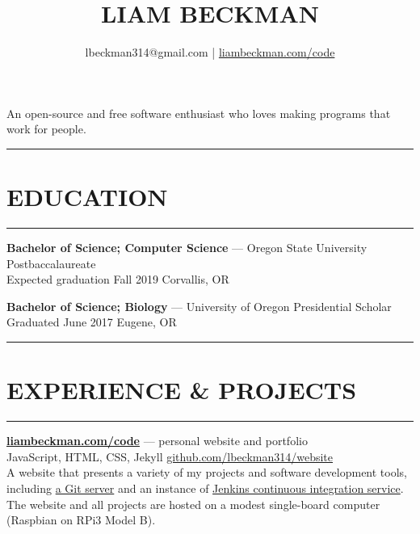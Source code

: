 \documentclass[a4paper]{article}
\title{\textcolor{my-red}{LIAM BECKMAN}}
\author{lbeckman314@gmail.com | \href{https://liambeckman.com/code}{liambeckman.com/code}}
\date{\vspace{-5ex}}
\begin{document}
\maketitle

\begin{center}
An open-source and free software enthusiast who loves making programs that work for people.
\end{center}

\textcolor{my-grey}{\rule{\textwidth}{1pt}\vspace{-1.5em}}
\section*{\large{EDUCATION}}\vspace{-1.5em}
\textcolor{my-grey}{\rule{\linewidth}{1pt}}

\medbreak

\textcolor{my-blue}{\textbf{Bachelor of Science; Computer Science}} --- Oregon State University Postbaccalaureate\\
\textcolor{my-grey}{Expected graduation Fall 2019 \hfill Corvallis, OR}

\textcolor{my-grey}{\dotfill}
\medbreak

\textcolor{my-blue}{\textbf{Bachelor of Science; Biology}} --- University of Oregon Presidential Scholar\\
\textcolor{my-grey}{Graduated June 2017 \hfill Eugene, OR}

\medbreak

\textcolor{my-grey}{\rule{\textwidth}{1pt}\vspace{-1.5em}}
\section*{\large{EXPERIENCE \& PROJECTS}}\vspace{-1.5em}
\textcolor{my-grey}{\rule{\linewidth}{1pt}}

\medbreak

\textcolor{my-blue}{\textbf{\href{https://liambeckman.com}{liambeckman.com/code}}} --- personal website and portfolio\\
\textcolor{my-grey}{JavaScript, HTML, CSS, Jekyll \hfill \href{https://github.com/lbeckman314/website}{github.com/lbeckman314/website}}\\

A website that presents a variety of my projects and software development tools, including \href{https://git.liambeckman.com}{a Git server} and an instance of \href{https://liambeckman.com/jenkins}{Jenkins continuous integration service}. The website and all projects are hosted on a modest single-board computer (Raspbian on RPi3 Model B).
\end{document}
